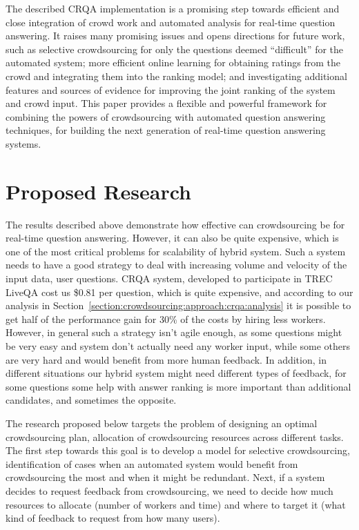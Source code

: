 The described CRQA implementation is a promising step towards efficient and close integration of crowd work and automated analysis for real-time question answering.
It raises many promising issues and opens directions for future work, such as selective crowdsourcing for only the questions deemed ``difficult'' for the automated system; more efficient online learning for obtaining ratings from the crowd and integrating them into the ranking model; and investigating additional features and sources of evidence for improving the joint ranking of the system and crowd input.
This paper provides a flexible and powerful framework for combining the powers of crowdsourcing with automated question answering techniques, for building the next generation of real-time question answering systems.

\section{Proposed Research}
\label{section:crowdsourcing:proposal}

The results described above demonstrate how effective can crowdsourcing be for real-time question answering.
However, it can also be quite expensive, which is one of the most critical problems for scalability of hybrid system.
Such a system needs to have a good strategy to deal with increasing volume and velocity of the input data, \ie user questions.
CRQA system, developed to participate in TREC LiveQA cost us \$0.81 per question, which is quite expensive, and according to our analysis in Section~\ref{section:crowdsourcing:approach:crqa:analysis} it is possible to get half of the performance gain for 30\% of the costs by hiring less workers.
However, in general such a strategy isn't agile enough, as some questions might be very easy and system don't actually need any worker input, while some others are very hard and would benefit from more human feedback.
In addition, in different situations our hybrid system might need different types of feedback, \eg for some questions some help with answer ranking is more important than additional candidates, and sometimes the opposite.

The research proposed below targets the problem of designing an optimal crowdsourcing plan, \ie allocation of crowdsourcing resources across different tasks.
The first step towards this goal is to develop a model for selective crowdsourcing, \ie identification of cases when an automated system would benefit from crowdsourcing the most and when it might be redundant.
Next, if a system decides to request feedback from crowdsourcing, we need to decide how much resources to allocate (number of workers and time) and where to target it (what kind of feedback to request from how many users).

